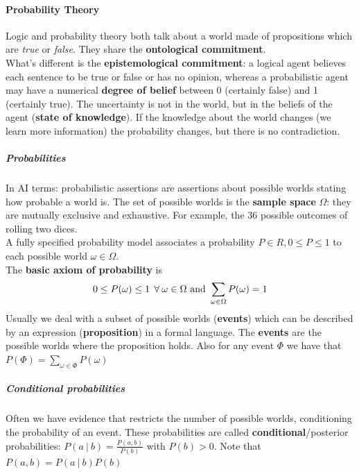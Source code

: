 \documentclass[10pt]{report}
\begin{document}
\paragraph{Probability Theory} Logic and probability theory both talk about a world made of propositions which are \textit{true} or \textit{false}. They share the \textbf{ontological commitment}.\\
What's different is the \textbf{epistemological commitment}: a logical agent believes each sentence to be true or false or has no opinion, whereas a probabilistic agent may have a numerical \textbf{degree of belief} between 0 (certainly false) and 1 (certainly true). The uncertainty is not in the world, but in the beliefs of the agent (\textbf{state of knowledge}). If the knowledge about the world changes (we learn more information) the probability changes, but there is no contradiction.
\subparagraph{Probabilities} In AI terms: probabilistic assertions are assertions about possible worlds stating how probable a world is. The set of possible worlds is the \textbf{sample space} $\Omega$: they are mutually exclusive and exhaustive. For example, the 36 possible outcomes of rolling two dices.\\
A fully specified probability model associates a probability $P\in R, 0\leq P \leq 1$ to each possible world $\omega\in\Omega$.\\
The \textbf{basic axiom of probability} is $$0\leq P(\omega)\leq 1\:\:\forall\:\omega\in\Omega\hbox{ and }\sum_{\omega\in\Omega} P(\omega) = 1$$
Usually we deal with a subset of possible worlds (\textbf{events}) which can be described by an expression (\textbf{proposition}) in a formal language. The \textbf{events} are the possible worlds where the proposition holds. Also for any event $\Phi$ we have that $P(\Phi) = \sum_{\omega\in\Phi} P(\omega)$
\subparagraph{Conditional probabilities} Often we have evidence that restricts the number of possible worlds, conditioning the probability of an event. These probabilities are called \textbf{conditional}/posterior probabilities: $P(a\:|\:b) = \frac{P(a,b)}{P(b)}$ with $P(b) > 0$. Note that $P(a,b)=P(a\:|\:b)P(b)$
\end{document}
